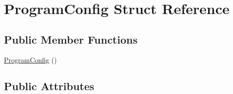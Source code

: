 \hypertarget{struct_program_config}{\section{Program\+Config Struct Reference}
\label{struct_program_config}
}
\subsection*{Public Member Functions}
\begin{DoxyCompactItemize}
\item 
\hyperlink{struct_program_config_ac2d47c453cf5f99370097f9aa8c75ded}{Program\+Config} ()
\end{DoxyCompactItemize}
\subsection*{Public Attributes}

